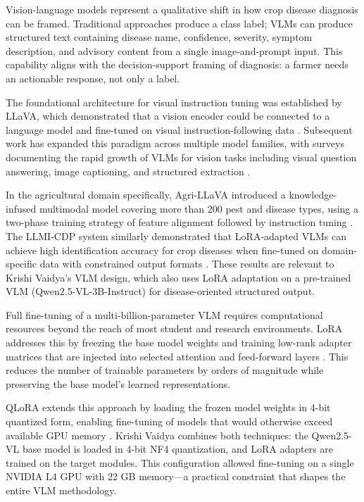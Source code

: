 

Vision-language models represent a qualitative shift in how crop disease diagnosis can be
framed. Traditional approaches produce a class label; VLMs can produce structured text
containing disease name, confidence, severity, symptom description, and advisory content
from a single image-and-prompt input. This capability aligns with the decision-support
framing of diagnosis: a farmer needs an actionable response, not only a label.

The foundational architecture for visual instruction tuning was established by LLaVA, which
demonstrated that a vision encoder could be connected to a language model and fine-tuned on
visual instruction-following data \parencite{liuLLaVA2023}. Subsequent work has expanded this
paradigm across multiple model families, with surveys documenting the rapid growth of VLMs
for vision tasks including visual question answering, image captioning, and structured extraction
\parencite{zhangVLMSurvey2024}.

In the agricultural domain specifically, Agri-LLaVA introduced a knowledge-infused multimodal
model covering more than 200 pest and disease types, using a two-phase training strategy
of feature alignment followed by instruction tuning \parencite{wangAgriLLaVA2024}. The
LLMI-CDP system similarly demonstrated that LoRA-adapted VLMs can achieve high identification
accuracy for crop diseases when fine-tuned on domain-specific data with constrained output
formats \parencite{yangLLMCropDisease2024}. These results are relevant to Krishi Vaidya's
VLM design, which also uses LoRA adaptation on a pre-trained VLM (Qwen2.5-VL-3B-Instruct)
for disease-oriented structured output.


Full fine-tuning of a multi-billion-parameter VLM requires computational resources beyond the
reach of most student and research environments. LoRA addresses this by freezing the base model
weights and training low-rank adapter matrices that are injected into selected attention and
feed-forward layers \parencite{hu2021lora}. This reduces the number of trainable parameters by
orders of magnitude while preserving the base model's learned representations.

QLoRA extends this approach by loading the frozen model weights in 4-bit quantized form,
enabling fine-tuning of models that would otherwise exceed available GPU memory
\parencite{dettmers2023qlora}. Krishi Vaidya combines both techniques: the Qwen2.5-VL base
model is loaded in 4-bit NF4 quantization, and LoRA adapters are trained on the target modules.
This configuration allowed fine-tuning on a single NVIDIA L4 GPU with 22 GB memory---a
practical constraint that shapes the entire VLM methodology.

